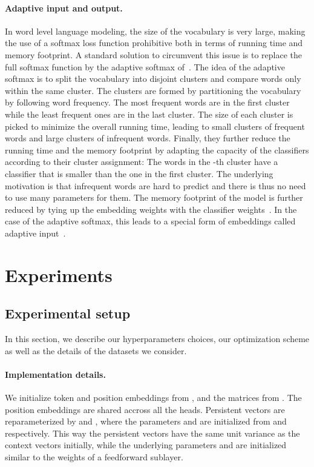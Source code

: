 \documentclass{article}
\begin{document}
\paragraph{Adaptive input and output.}
In word level language modeling, the size of the vocabulary is very large, making the use of a softmax loss function prohibitive both in terms of running time and memory footprint.
A standard solution to circumvent this issue is to replace the full softmax function by the adaptive softmax of~\citet{grave2017efficient}.
The idea of the adaptive softmax is to split the vocabulary into disjoint clusters and compare words only within the same cluster.
The clusters  are formed by partitioning the vocabulary  by following word frequency.
The most frequent words are in the first cluster  while the least frequent ones are in the last cluster.
The size of each cluster is picked to minimize the overall running time, leading to small clusters of frequent words and large clusters of infrequent words.
Finally, they further reduce the running time and the memory footprint by adapting the capacity of the classifiers according to their cluster assignment:
The words in the -th cluster have a classifier that is   smaller than the one in the first cluster.
The underlying motivation is that infrequent words are hard to predict and there is thus no need to use many parameters for them.
The memory footprint of the model is further reduced by tying up the embedding weights with the classifier weights~\cite{inan2016tying,press2016using}.
In the case of the adaptive softmax, this leads to a special form of embeddings called adaptive input~\cite{baevski2018adaptive}.
 
\section{Experiments}
\label{sec:experiments}

\subsection{Experimental setup}

In this section, we describe our hyperparameters choices, our optimization scheme as well as the details of the datasets we consider.

\paragraph{Implementation details.}
We initialize token and position embeddings from , and the matrices  from . The position embeddings are shared accross all the heads.
Persistent vectors are reparameterized by  and , where the parameters  and  are initialized from  and  respectively. This way the persistent vectors have the same unit variance as the context vectors initially, while the underlying parameters  and  are initialized similar to the weights of a feedforward sublayer.
\end{document}
